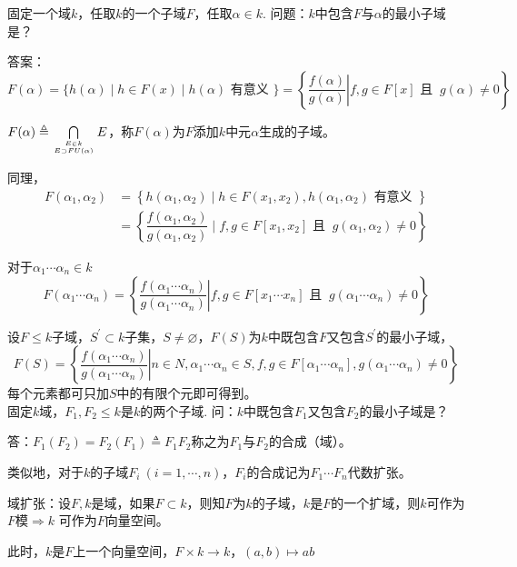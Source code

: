 \documentclass[UTF8]{article}
\begin{document}
固定一个域$k$，任取$k$的一个子域$F$，任取$\alpha\in k$.
问题：$k$中包含$F$与$\alpha$的最小子域是？

答案：$F(\alpha)=\{h(\alpha) \mid h \in F(x) \mid h(\alpha)\text{  有意义 }\}=\left\{ \left.\dfrac{f(\alpha)}{g(\alpha)}\right| f,g\in F[x]\text{ 且 }\ g(\alpha)\neq 0\right\}$

\hspace{11pt}$F(\alpha) \triangleq\bigcap\limits_{E\in k\atop E\supset FU(\alpha)}E$，称$F(\alpha)$为$F$添加$k$中元$\alpha$生成的子域。

同理，
$$
\begin{aligned}
F\left( \alpha_1,\alpha_2\right)&=\left\{ h\left(\alpha_{1}, \alpha_{2}\right) \mid h \in F\left(x_{1}, x_{2}\right), h\left(\alpha_{1}, \alpha_{2}\right)\text{ 有意义 }\right\}\\ 
&=\left\{ \dfrac{f(\alpha_1, \alpha_2)}{g(\alpha_1, \alpha_2)}\mid f, g \in F\left[x_{1}, x_{2}\right]\text{ 且 }\ g(\alpha_1, \alpha_2) \neq 0\right\}
\end{aligned}
$$

对于$\alpha_{1} \cdots \alpha_{n} \in k$
$$
F\left( \alpha_{1} \cdots \alpha_{n}\right)=\left\{ \left.\dfrac{f\left( \alpha_{1} \cdots \alpha_{n}\right)}{g\left( \alpha_{1} \cdots \alpha_{n}\right)}\right| f,g\in F\left[ x_{1} \cdots x_{n}\right]\text{ 且 }\ g\left( \alpha_{1} \cdots \alpha_{n}\right)\neq 0\right\}
$$

设$F\leqslant k$子域，$S^{\prime}\subset k$子集，$S\neq\varnothing$，$F(S)$为$k$中既包含$F$又包含$S^{\prime}$的最小子域，
$$
F(S)=\left\{ \left. \dfrac{f\left( \alpha_{1} \cdots \alpha_{n}\right)}{g\left( \alpha_{1} \cdots \alpha_{n}\right)}\right| n\in N, \alpha_{1} \cdots \alpha_{n}\in S, f,g\in F\left[\alpha_{1} \cdots \alpha_{n}\right], g\left( \alpha_{1} \cdots \alpha_{n}\right)\neq 0\right\}
$$
每个元素都可只加$S$中的有限个元即可得到。\\


固定$k$域，$F_1,F_{2} \leq k$是$k$的两个子域.
问：$k$中既包含$F_1$又包含$F_2$的最小子域是？

答：$F_{1}\left(F_{2}\right)=F_{2}\left(F_{1}\right)\triangleq F_1F_2$称之为$F_1$与$F_2$的合成（域）。

类似地，对于$k$的子域$F_i\ (i=1,\cdots, n)$，$F_i$的合成记为$F_1\cdots F_n$代数扩张。

域扩张：设$F, k$是域，如果$F\subset k$，则知$F$为$k$的子域，$k$是$F$的一个扩域，则$k$可作为$F$模$\Rightarrow k$ 可作为$F$向量空间。

此时，$k$是$F$上一个向量空间，$F \times k \longrightarrow k$，$(a, b) \longmapsto a b$
\end{document}
